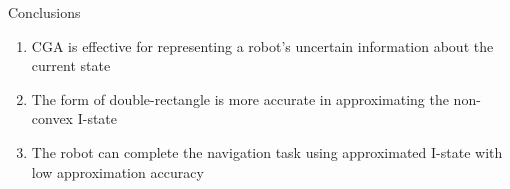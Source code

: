 \begin{frame}{Conclusions}
  \begin{enumerate}
  \item CGA is effective for representing a robot's uncertain information about
    the current state
  \item The form of double-rectangle is more accurate in approximating the non-convex I-state
  \item The robot can complete the navigation task using approximated I-state with
    low approximation accuracy
  \end{enumerate}
\end{frame}